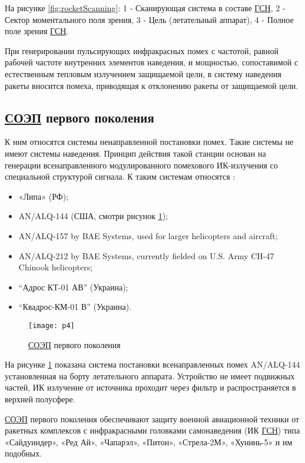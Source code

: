 На рисунке \ref{fig:rocketScanning}: 1 - Сканирующая система в составе \hyperref[acroGSN]{ГСН}, 2 - Сектор моментального поля зрения, 3 - Цель (летательный аппарат), 4 - Полное поле зрения \hyperref[acroGSN]{ГСН}.	
	
При генерировании пульсирующих инфракрасных помех с частотой, равной рабочей частоте внутренних элементов наведения, и мощностью, сопоставимой с естественным тепловым излучением защищаемой цели, в систему наведения ракеты вносится помеха, приводящая к отклонению ракеты от защищаемой цели. 

\subsection{ \hyperref[acroSOEP]{СОЭП} первого поколения}	

К ним относятся системы ненаправленной постановки помех. Такие системы не имеют системы наведения. Принцип действия такой станции основан на генерации всенаправленного модулированного помехового ИК-излучения со специальной структурой сигнала. К таким системам относятся \cite[]{SOEP_LIPA}:

\begin{itemize}
	\item «Липа» (РФ);	
	\item AN/ALQ-144 (США, смотри рисунок \ref{fig:alq});	
	\item AN/ALQ-157 by BAE Systems, used for larger helicopters and aircraft;
	\item AN/ALQ-212 by BAE Systems, currently fielded on U.S. Army CH-47 Chinook helicopters;
	\item “Адрос КТ-01 АВ” (Украина);
	\item “Квадрос-КМ-01 В” (Украина). 		
\end{itemize}

\begin{figure}[ht]
	\centering
	\texttt{[image: p4]} 
	\caption{ \hyperref[acroSOEP]{СОЭП} первого поколения}
	\label{fig:alq}
\end{figure}
На рисунке \ref{fig:alq} показана система постановки всенаправленных помех AN/ALQ-144 установленная на борту летательного аппарата. Устройство не имеет подвижных частей, ИК излучение от источника проходит через фильтр и распространяется в верхней полусфере.

 \hyperref[acroSOEP]{СОЭП} первого поколения обеспечивают защиту военной авиационной техники от ракетных комплексов с инфракрасными головками самонаведения (ИК \hyperref[acroGSN]{ГСН}) типа «Сайдуиндер», «Ред Ай», «Чапарэл», «Питон», «Стрела-2М», «Хунинь-5» и им подобных. 

